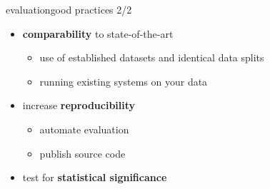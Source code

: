         \begin{frame}{evaluation}{good practices 2/2}
           \begin{itemize}
                \item<1->   \textbf{comparability} to state-of-the-art
                    \begin{itemize}
                        \item   use of established datasets and identical data splits
                        \item   running existing systems on your data
                    \end{itemize}
                \bigskip
               \item<2->   increase \textbf{reproducibility}
                    \begin{itemize}
                        \item   automate evaluation
                        \item   publish source code
                    \end{itemize}
                \bigskip
                \item<3->   test for \textbf{statistical significance}
            \end{itemize}
        \end{frame}

